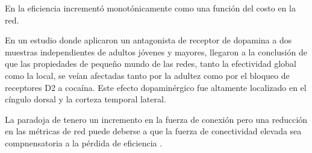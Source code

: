 En \textcite{Achard2007} la eficiencia incrementó monotónicamente como una función del costo en la red.

En un estudio donde aplicaron un antagonista de receptor de dopamina a dos muestras independientes de adultos jóvenes y mayores, \textcite{Achard2007} llegaron a la conclusión de que las propiedades de pequeño mundo de las redes, tanto la efectividad global como la local, se veían afectadas tanto por la adultez como por el bloqueo de receptores D2 a cocaína. Este efecto dopaminérgico fue altamente localizado en el cíngulo dorsal y la corteza temporal lateral.

La paradoja de tenero un incremento en la fuerza de conexión pero una reducción en las métricas de red puede deberse a que la fuerza de conectividad elevada sea compnensatoria a la pérdida de eficiencia \parencite{Wang2015a}.
